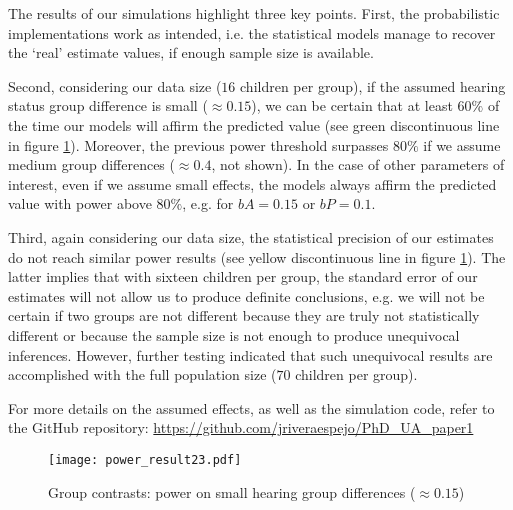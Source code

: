 \begin{comment}
	Moreover, we tested three goals\footnote{see \citet{Kruschke_2015} chapter 13 for a detailed overview of the method.}: (a) reject the null value of a parameter, (b) affirm a predicted value, and (c) achieve an estimate precision.
\end{comment}

The results of our simulations highlight three key points. First, the probabilistic implementations work as intended, i.e. the statistical models manage to recover the `real' estimate values, if enough sample size is available. 

Second, considering our data size ($16$ children per group), if the assumed hearing status group difference is small ($\approx 0.15$), we can be certain that at least $60\%$ of the time our models will affirm the predicted value (see green discontinuous line in figure \ref{fig:contrasts}). Moreover, the previous power threshold surpasses $80\%$ if we assume medium group differences ($\approx 0.4$, not shown). In the case of other parameters of interest, even if we assume small effects, the models always affirm the predicted value with power above $80\%$, e.g. for $bA=0.15$ or $bP=0.1$.

Third, again considering our data size, the statistical precision of our estimates do not reach similar power results (see yellow discontinuous line in figure \ref{fig:contrasts}). The latter implies that with sixteen children per group, the standard error of our estimates will not allow us to produce definite conclusions, e.g. we will not be certain if two groups are not different because they are truly not statistically different or because the sample size is not enough to produce unequivocal inferences. However, further testing indicated that such unequivocal results are accomplished with the full population size ($70$ children per group).
%
\begin{comment}
	The results of our simulations indicated that each statistical model was able to recover the `real' parameters values, when the sample size was similar to the population size.
	
	Third and final, no parameter (nor any contrast) managed to reject the null hypothesis or achieve high estimates precision with power above the $80\%$ threshold.
\end{comment}

For more details on the assumed effects, as well as the simulation code, refer to the GitHub repository: \url{https://github.com/jriveraespejo/PhD_UA_paper1}
%
\begin{figure}[!h]
	\centering
	\texttt{[image: power\_result23.pdf]}
	\caption[Group contrasts: power on small hearing group differences]{Group contrasts: power on small hearing group differences ($\approx 0.15$)}
	\label{fig:contrasts}
\end{figure}
%
%
